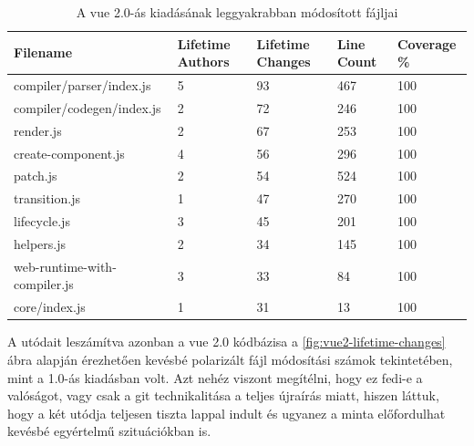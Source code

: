 \begin{table}[h]
    \hspace*{-1cm}\begin{tabular}{l|l|l|l|l}
        Filename                     & Lifetime Authors & Lifetime Changes & Line Count & Coverage \% \\ \hline
        compiler/parser/index.js     & 5                & 93               & 467        & 100         \\
        compiler/codegen/index.js    & 2                & 72               & 246        & 100         \\
        render.js                    & 2                & 67               & 253        & 100         \\
        create-component.js          & 4                & 56               & 296        & 100         \\
        patch.js                     & 2                & 54               & 524        & 100         \\
        transition.js                & 1                & 47               & 270        & 100         \\
        lifecycle.js                 & 3                & 45               & 201        & 100         \\
        helpers.js                   & 2                & 34               & 145        & 100         \\
        web-runtime-with-compiler.js & 3                & 33               & 84         & 100         \\
        core/index.js                & 1                & 31               & 13         & 100
    \end{tabular}
    \caption{A vue 2.0-ás kiadásának leggyakrabban módosított fájljai} \label{table:vue2-top-files}
\end{table}

A  utódait leszámítva azonban a vue 2.0 kódbázisa a \ref{fig:vue2-lifetime-changes} ábra alapján érezhetően kevésbé polarizált fájl módosítási számok tekintetében, mint a 1.0-ás kiadásban volt. Azt nehéz viszont megítélni, hogy ez fedi-e a valóságot, vagy csak a git technikalitása a teljes újraírás miatt, hiszen láttuk, hogy a  két utódja teljesen tiszta lappal indult és ugyanez a minta előfordulhat kevésbé egyértelmű szituációkban is.

